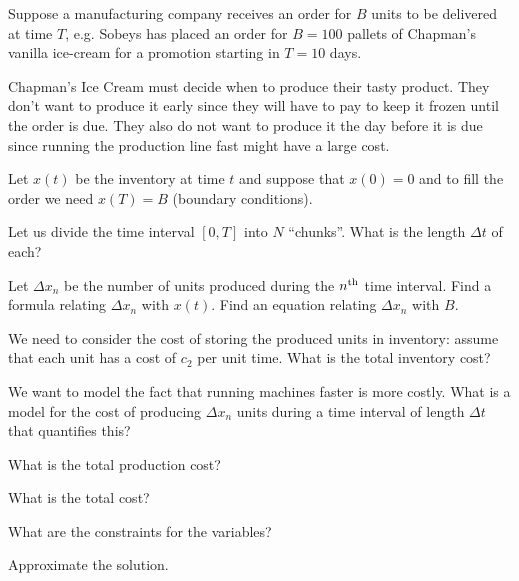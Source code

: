 \documentclass{workbook}
\begin{document}
\begin{slide}

\question

\begin{problem}

Suppose a manufacturing company receives an order for $B$ units to be delivered at time $T$, e.g. Sobeys has placed an order for $B = 100$ pallets of Chapman's vanilla ice-cream for a promotion starting in $T = 10$ days.

Chapman's Ice Cream must decide when to produce their tasty product. They don't want to produce it early since they will have to pay to keep it frozen until the order is due. They also do not want to produce it the day before it is due since running the production line fast might have a large cost. %
\end{problem}

Let $x(t)$ be the inventory at time $t$ and suppose that $x(0)=0$ and to fill the order we need $x(T)=B$ (boundary conditions).

\begin{parts}
	\item Let us divide the time interval $[0,T]$ into $N$ ``chunks''. What is the length $\Delta t$ of each?
	\item Let $\Delta x_n$ be the number of units produced during the $n^{\rm th}$ time interval. Find a formula relating $\Delta x_n$ with $x(t)$. Find an equation relating $\Delta x_n$ with $B$.
	\item We need to consider the cost of storing the produced units in inventory: assume that each unit has a cost of $c_2$ per unit time. What is the total inventory cost?
	\item We want to model the fact that running machines faster is more costly. What is a model for the cost of producing $\Delta x_n$ units during a time interval of length $\Delta t$ that quantifies this?
	\item What is the total production cost? 
	\item What is the total cost?
	\item What are the constraints for the variables?
	\item Approximate the solution.
\end{parts}
\end{slide}
\end{document}
